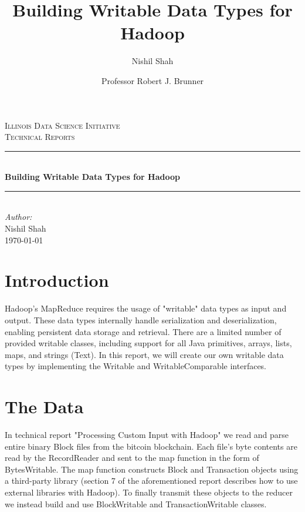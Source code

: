 \documentclass[9pt,twocolumn,twoside]{idsi}
\author[1,3]{Nishil Shah}
\author[2,3]{Professor Robert J. Brunner}
\affil[1]{National Center For Supercomputing Applications (NCSA)}
\affil[2]{Laboratory for Computation, Data, and Machine Learning}
\affil[3]{Illinois Data Science Initiative}
\title{Building Writable Data Types for Hadoop}
\newcommand{\HRule}{\rule{\linewidth}{0.5mm}}
\begin{document}
\begin{titlepage}
\center
\textsc{\LARGE Illinois Data Science Initiative}\\[1.5cm]
\textsc{\Large Technical Reports}\\[0.5cm] \HRule \\[0.4cm]
{\huge \bfseries Building Writable Data Types for Hadoop } \\[0.4cm] \HRule \\[1.5cm]
\Large \emph{Author:}\\ Nishil Shah \\[3cm]
{\large \today}\\[3cm] %
\vfill
\end{titlepage}
%

\maketitle

\section{Introduction}

Hadoop's MapReduce requires the usage of "writable" data types as input and output. These data types internally handle serialization and deserialization, enabling persistent data storage and retrieval. There are a limited number of provided writable classes, including support for all Java primitives, arrays, lists, maps, and strings (Text). In this report, we will create our own writable data types by implementing the Writable and WritableComparable interfaces.

\section{The Data}

In technical report "Processing Custom Input with Hadoop" we read and parse entire binary Block files from the bitcoin blockchain. Each file's byte contents are read by the RecordReader and sent to the map function in the form of BytesWritable. The map function constructs Block and Transaction objects using a third-party library (section 7 of the aforementioned report describes how to use external libraries with Hadoop). To finally transmit these objects to the reducer we instead build and use BlockWritable and TransactionWritable classes.
\end{document}
